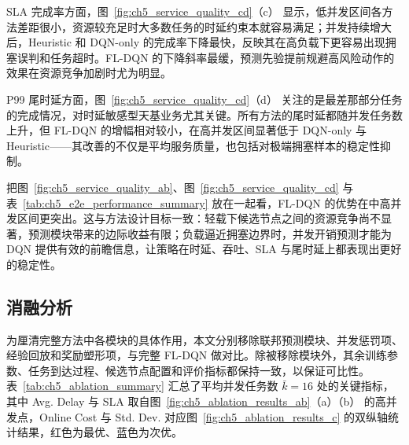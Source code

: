 SLA 完成率方面，图~\ref{fig:ch5_service_quality_cd}（c） 显示，低并发区间各方法差距很小，资源较充足时大多数任务的时延约束本就容易满足；并发持续增大后，Heuristic 和 DQN-only 的完成率下降最快，反映其在高负载下更容易出现拥塞误判和任务超时。FL-DQN 的下降斜率最缓，预测先验提前规避高风险动作的效果在资源竞争加剧时尤为明显。

P99 尾时延方面，图~\ref{fig:ch5_service_quality_cd}（d） 关注的是最差那部分任务的完成情况，对时延敏感型天基业务尤其关键。所有方法的尾时延都随并发任务数上升，但 FL-DQN 的增幅相对较小，在高并发区间显著低于 DQN-only 与 Heuristic——其改善的不仅是平均服务质量，也包括对极端拥塞样本的稳定性抑制。

把图~\ref{fig:ch5_service_quality_ab}、图~\ref{fig:ch5_service_quality_cd} 与表~\ref{tab:ch5_e2e_performance_summary} 放在一起看，FL-DQN 的优势在中高并发区间更突出。这与方法设计目标一致：轻载下候选节点之间的资源竞争尚不显著，预测模块带来的边际收益有限；负载逼近拥塞边界时，并发开销预测才能为 DQN 提供有效的前瞻信息，让策略在时延、吞吐、SLA 与尾时延上都表现出更好的稳定性。
\subsection{消融分析}
\label{subsec:ch5_ablation_results}

为厘清完整方法中各模块的具体作用，本文分别移除联邦预测模块、并发惩罚项、经验回放和奖励塑形项，与完整 FL-DQN 做对比。除被移除模块外，其余训练参数、任务到达过程、候选节点配置和评价指标都保持一致，以保证可比性。表~\ref{tab:ch5_ablation_summary} 汇总了平均并发任务数 $\bar{k}=16$ 处的关键指标，其中 Avg. Delay 与 SLA 取自图~\ref{fig:ch5_ablation_results_ab}（a）（b） 的高并发点，Online Cost 与 Std. Dev. 对应图~\ref{fig:ch5_ablation_results_c} 的双纵轴统计结果，红色为最优、蓝色为次优。

